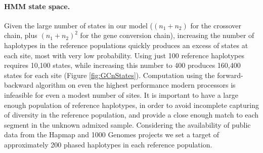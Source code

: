 \paragraph{HMM state space.}
Given the large number of states in our model ($(n_1+n_2)$ for the crossover chain, plus $(n_1+n_2)^2$ for the gene conversion chain), increasing the number of haplotypes in the reference populations quickly produces an excess of states at each site, most with very low probability.
Using just 100 reference haplotypes requires 10,100 states, while increasing this number to 400 produces 160,400 states for each site (Figure \ref{fig:GCnStates}).
Computation using the forward-backward algorithm on even the highest performance modern processors is infeasible for even a modest number of sites.
It is important to have a large enough population of reference haplotypes, in order to avoid incomplete capturing of diversity in the reference population, and provide a close enough match to each segment in the unknown admixed sample.
Considering the availability of public data from the Hapmap\cite{hapmap2007} and 1000 Genomes projects\cite{1000G2015} we set a target of approximately 200 phased haplotypes in each reference population.

